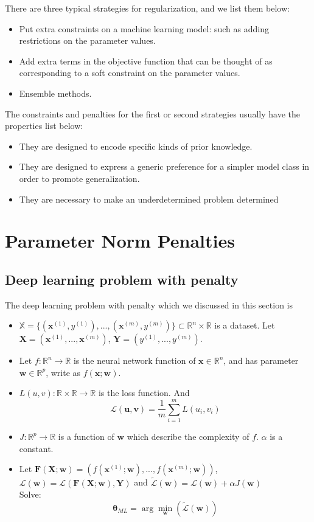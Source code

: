 \documentclass{article}
\begin{document}
	There are three typical strategies for regularization, and we list them below:
		\begin{itemize}
			\item Put extra	constraints on a machine learning model: such as adding restrictions on the	parameter values.
			\item Add extra terms in the objective function that can be	thought of as corresponding to a soft constraint on the parameter values.
			\item Ensemble methods.
	\end{itemize}
	The	constraints and penalties for the first or second strategies usually have the properties list below:
			\begin{itemize}
				\item They are designed to encode specific kinds of prior knowledge.
				\item They are designed to express a generic preference for a simpler model class in order to promote generalization.
				\item They are necessary to make an underdetermined problem determined		 
			\end{itemize}
		
		\section{Parameter Norm Penalties}
		\subsection{Deep learning problem with penalty}
		The deep learning problem with penalty which we discussed in this section is 
		\begin{itemize}
			\item $\mathbb X = \{(\bm x^{(1)},y^{(1)}),...,(\bm x^{(m)},y^{(m)})\} \subset \mathbb R^n \times \mathbb R$ is a dataset. Let $\bm X =(\bm x^{(1)},...,\bm x^{(m)})$, $\bm Y=(y^{(1)},...,y^{(m)})$.
			\item Let $f:\mathbb R^n\rightarrow \mathbb R$ is the neural network function of $\bm x\in \mathbb R^n$, and has parameter $\bm w \in \mathbb R^p$, write as $f(\bm x;\bm w)$.
			\item $L(u,v):\mathbb R \times \mathbb R \rightarrow \mathbb R$ is the loss function. And
			$$
			\mathcal L(\bm u,\bm v)=\dfrac 1m\sum_{i=1}^m L(u_i,v_i)
			$$
			\item $J:\mathbb R^p\rightarrow \mathbb R$ is a function of $\bm w$ which describe the complexity of $f$. $\alpha$ is a constant. 
			\item Let $\bm F(\bm X;\bm w)=(f(\bm x^{(1)};\bm w),...,f(\bm x^{(m)};\bm w))$, $\mathcal{L}(\bm w) = \mathcal L(\bm F(\bm X;\bm w),\bm Y) $ and $\tilde{\mathcal L}(\bm w) = \mathcal L(\bm w) + \alpha J(\bm w) $\\ Solve:
			$$
			\bm \theta_{ML}=\arg \min_{\bm w}(\tilde{\mathcal L}(\bm w) )
			$$
	\end{itemize}
\end{document}
